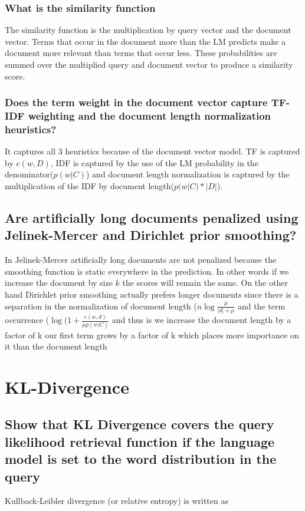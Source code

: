 \documentclass[11pt]{article}
\begin{document}
\subsubsection{What is the similarity function}
The similarity function is the multiplication by query vector and the document vector. Terms that occur in the document more than the LM predicts make a document more relevant than terms that occur less. These probabilities are summed over the multiplied query and document vector to produce a similarity score. 
\subsubsection{Does the term weight in the document vector capture TF-IDF weighting and the document length normalization heuristics?}
It captures all 3 heuristics because of the document vector model. TF is captured by $c(w,D)$, IDF is captured by the use of the LM probability in the denominator($p(w|C)$) and document length normalization is captured by the multiplication of the IDF by document length($p(w|C) * |D|$).
\subsection{Are artificially long documents penalized using Jelinek-Mercer and Dirichlet prior smoothing?}
In Jelinek-Mercer artificially long documents are not penalized because the smoothing function is static everywhere in the prediction. In other words if we increase the document by size $k$ the scores will remain the same. On the other hand Dirichlet prior smoothing actually prefers longer documents since there is a separation in the normalization of document length ($n \log \frac{\mu}{|d| + \mu}$ and the term occurrence ($\log (1+\frac{c(w,d)}{\mu p(w|C)}$ and thus is we increase the document length by a factor of k our first term grows by a factor of k which places more importance on it than the document length
\section{KL-Divergence}
\subsection{Show that KL Divergence covers the query likelihood retrieval function if the language model is set to the word distribution in the query}
Kullback-Leibler divergence (or relative entropy) is written as
\end{document}
